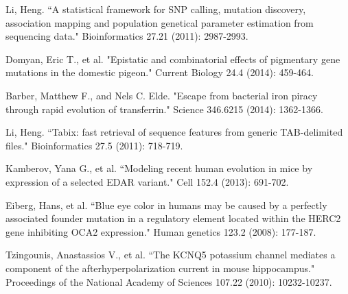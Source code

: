 \documentclass[10pt,letterpaper]{article}
\begin{document}
\begin{thebibliography}{10}
Li, Heng. ``A statistical framework for SNP calling, mutation discovery, association mapping and population genetical parameter estimation from sequencing data." Bioinformatics 27.21 (2011): 2987-2993.

Domyan, Eric T., et al. "Epistatic and combinatorial effects of pigmentary gene mutations in the domestic pigeon." Current Biology 24.4 (2014): 459-464.

Barber, Matthew F., and Nels C. Elde. "Escape from bacterial iron piracy through rapid evolution of transferrin." Science 346.6215 (2014): 1362-1366.

Li, Heng. ``Tabix: fast retrieval of sequence features from generic TAB-delimited files." Bioinformatics 27.5 (2011): 718-719.

Kamberov, Yana G., et al. ``Modeling recent human evolution in mice by expression of a selected EDAR variant." Cell 152.4 (2013): 691-702.

Eiberg, Hans, et al. ``Blue eye color in humans may be caused by a perfectly associated founder mutation in a regulatory element located within the HERC2 gene inhibiting OCA2 expression." Human genetics 123.2 (2008): 177-187.


Tzingounis, Anastassios V., et al. ``The KCNQ5 potassium channel mediates a component of the afterhyperpolarization current in mouse hippocampus." Proceedings of the National Academy of Sciences 107.22 (2010): 10232-10237.

\end{thebibliography}
\end{document}
